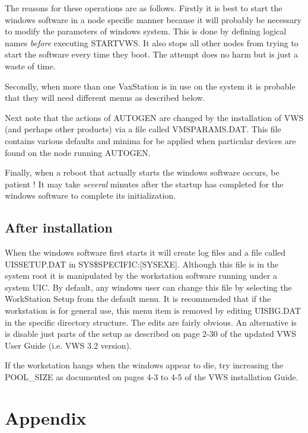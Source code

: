 The reasons for these operations are as follows.
Firstly it is best to start the windows software in a node specific manner
because it will probably be necessary to modify the parameters of windows
system. 
This is done by defining logical names {\em before} executing STARTVWS.
It also stops all other nodes from trying to start the software every time
they boot. The attempt does no harm but is just a waste of time.

Secondly, when more than one VaxStation is in use on the system it is probable
that they will need different menus as described below.

Next note that the actions of AUTOGEN are changed by the installation of
VWS (and perhaps other products) via a file called VMSPARAMS.DAT.
This file contains various defaults and minima for be applied when particular
devices are found on the node running AUTOGEN.

Finally, when a reboot that actually starts the windows software occurs, be
patient ! It may take {\em several} minutes after the startup has completed
for the windows software to complete its initialization.

\subsection {After installation}

When the windows software first starts it will create log files and a file
called UISSETUP.DAT in SYS\$SPECIFIC:[SYSEXE].
Although this file is in the system root it is manipulated by the workstation
software running under a system UIC.
By default, any windows user can change this file by selecting the WorkStation
Setup from the default menu.
It is recommended that if the workstation is for general use, this menu item
is removed by editing UISBG.DAT in the specific directory structure.
The edits are fairly obvious.
An alternative is is disable just parts of the setup as described on page
2-30 of the updated VWS User Guide (i.e. VWS 3.2 version).

If the workstation hangs when the windows appear to die,
try increasing the POOL\_SIZE as documented on pages 4-3 to 4-5 of the
VWS installation Guide.

\appendix

\section {Appendix}


